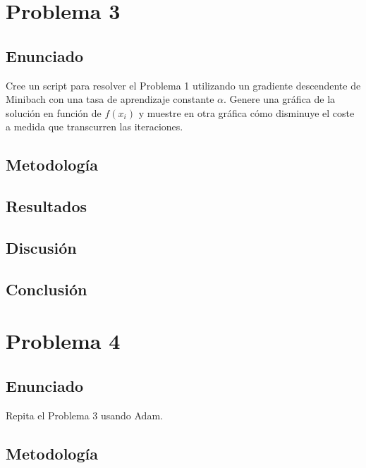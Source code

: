 \documentclass{article}
\begin{document}
\section{Problema 3}

\subsection{Enunciado}

Cree un script para resolver el Problema 1 utilizando un gradiente descendente de Minibach con una tasa de aprendizaje constante $\alpha$. Genere una gráfica de la solución en función de $f(x_i)$ y muestre en otra gráfica cómo disminuye el coste a medida que transcurren las iteraciones.

\subsection{Metodología}

\subsection{Resultados}
\setcounter{equation}{0}

\subsection{Discusión}

\subsection{Conclusión}

\section{Problema 4}

\subsection{Enunciado}

Repita el Problema 3 usando Adam.

\subsection{Metodología}
\end{document}
